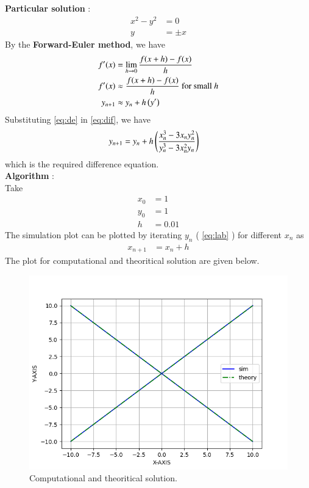 \documentclass[journal]{IEEEtran}
\begin{document}
\textbf{Particular solution} : \\
\begin{align}
	x^2 - y^2 &= 0 \\
	y &= \pm x 
\end{align}
By the \textbf{Forward-Euler method}, we have \\
\begin{align}
	f^{\prime} (x) &= \lim_{h \to 0} \frac{f(x+h) - f(x)}{h} \\
	f^{\prime} (x) &\approx \frac{f(x+h) - f(x)}{h} \text{ for small } h\\
	y_{n+1} &\approx y_{n} + h \left(y^{\prime}\right) \label{eq:dif}
\end{align}
Substituting \eqref{eq:de} in \eqref{eq:dif}, we have 
\begin{align}
	y_{n+1} &= y_{n} + h \left(\frac{x_{n}^3 - 3x_{n}y_{n}^2}{y_{n}^3 - 3x_{n}^2y_{n}}\right) \label{eq:lab}
\end{align}
which is the required difference equation. \\
\textbf{Algorithm} : \\
Take
\begin{align}
	x_0 &= 1 \\
	y_0 &= 1 \\
	h &= 0.01 
\end{align}
The simulation plot can be plotted by iterating $y_{n}$ ( \eqref{eq:lab} ) for different $x_{n}$ as
\begin{align}
	x_{n+1} &= x_{n} + h 
\end{align}
The plot for computational and theoritical solution are given below.
\begin{figure}[h]
				 \centering
				 \includegraphics[width=\columnwidth]{figs/fig1.png}
				 \caption{Computational and theoritical solution.}
				 \label{fig:Plot1} 
			 \end{figure}



	
\end{document}
